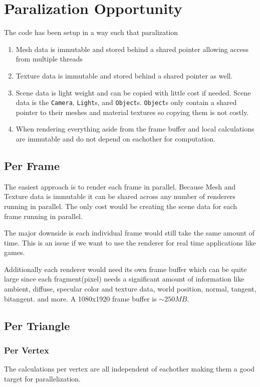 \documentclass[12pt]{article}
\begin{document}
\section{Paralization Opportunity}
The code has been setup in a way such that paralization 

\begin{enumerate}
	\item Mesh data is immutable and stored behind a shared pointer allowing access from multiple threads
	\item Texture data is immutable and stored behind a shared pointer as well.
	\item Scene data is light weight and can be copied with little cost if needed.
	\subitem Scene data is the \texttt{Camera}, \texttt{Light}s, and \texttt{Object}s.
	\subitem \texttt{Object}s only contain a shared pointer to their meshes and material textures so copying them is not costly.
	\item When rendering everything aside from the frame buffer and local calculations are immutable and do not depend on eachother for computation.
\end{enumerate}

\subsection{Per Frame}
The easiest approach is to render each frame in parallel. Because Mesh and Texture data is immutable it can be shared across any number of renderers running in parallel. The only cost would be creating the scene data for each frame running in parallel.

The major downside is each individual frame would still take the same amount of time. This is an issue if we want to use the renderer for real time applications like games.

Additionally each renderer would need its own frame buffer which can be quite large since each fragment(pixel) needs a significant amount of information like ambient, diffuse, specular color and texture data, world position, normal, tangent, bitangent. and more. A 1080x1920 frame buffer is $\sim 250MB$.

\subsection{Per Triangle}
\subsubsection{Per Vertex}
The calculations per vertex are all independent of eachother making them a good target for parallelization.
\end{document}
